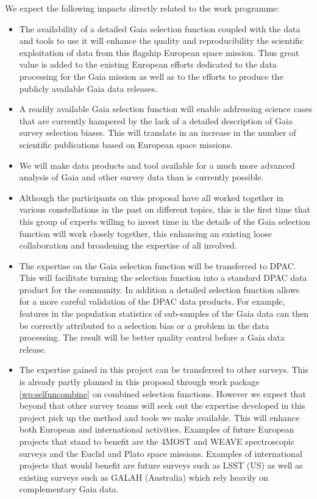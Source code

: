 We expect the following impacts directly related to the work programme:
\begin{itemize}
    \item The availability of a detailed Gaia selection function coupled with the data and tools to use it will enhance the quality and reproducibility the scientific exploitation of data from this flagship European space mission. Thus great value is added to the existing European efforts dedicated to the data processing for the Gaia mission as well as to the efforts to produce the publicly available Gaia data releases.
    \item A readily available Gaia selection function will enable addressing science cases that are currently hampered by the lack of a detailed description of Gaia survey selection biases. This will translate in an increase in the number of scientific publications based on European space missions.
    \item We will make data products and tool available for a much more advanced analysis of Gaia and other survey data than is currently possible.
    \item Although the participants on this proposal have all worked together in various constellations in the past on different topics, this is the first time that this group of experts willing to invest time in the details of the Gaia selection function will work closely together, this enhancing an existing loose collaboration and broadening the expertise of all involved.
    \item The expertise on the Gaia selection function will be transferred to DPAC. This will facilitate turning the selection function into a standard DPAC data product for the community. In addition a detailed selection function allows for a more careful validation of the DPAC data products. For example, features in the population statistics of sub-samples of the Gaia data can then be correctly attributed to a selection bias or a problem in the data processing. The result will be better quality control before a Gaia data release.
    \item The expertise gained in this project can be transferred to other surveys. This is already partly planned in this proposal through work package \ref{wp:selfuncombine} on combined selection functions. However we expect that beyond that other survey teams will seek out the expertise developed in this project pick up the method and tools we make available. This will enhance both European and international activities. Examples of future European projects that stand to benefit are the 4MOST and WEAVE spectroscopic surveys and the Euclid and Plato space missions. Examples of international projects that would benefit are future surveys such as LSST (US) as well as existing surveys such as GALAH (Australia) which rely heavily on complementary Gaia data.
\end{itemize}

